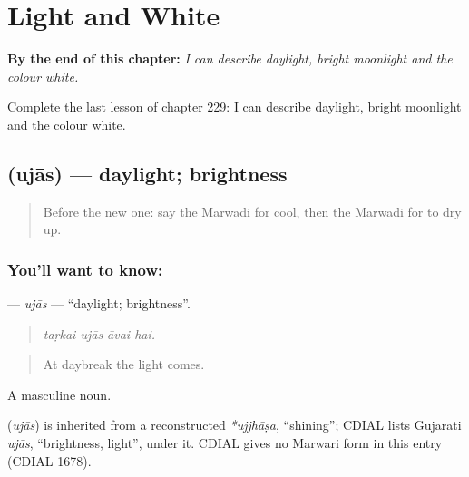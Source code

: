 
\chapter{Light and White}
\label{ch:mw-light-and-white}

\begin{chapteropening}
\textbf{By the end of this chapter:} \emph{I can describe daylight, bright moonlight and the colour white.}

Complete the last lesson of chapter 229: I can describe daylight, bright moonlight and the colour white.
\end{chapteropening}

\section[\texorpdfstring{\mw{उजास} (ujās)}{उजास (ujās)}]{ (ujās) — daylight; brightness}

\label{lesson:MW-C229-ujas}



\begin{quote}
Before the new one: say the Marwadi for cool, then the Marwadi for to dry up.
\end{quote}

\subsection*{You'll want to know: }
\textbf{} — \emph{ujās} — \textquotedblleft{}daylight; brightness\textquotedblright{}.

\begin{quote}
   
\end{quote}

\begin{quote}
\emph{taṛkai ujās āvai hai.}
\end{quote}

\begin{quote}
At daybreak the light comes.
\end{quote}

A masculine noun.

\begin{cousinweb}
\textbf{} (\emph{ujās}) is inherited from a reconstructed \emph{*ujjhāṣa}, \textquotedblleft{}shining\textquotedblright{}; CDIAL lists Gujarati \emph{ujās}, \textquotedblleft{}brightness, light\textquotedblright{}, under it. CDIAL gives no Marwari form in this entry (CDIAL 1678).
\end{cousinweb}

